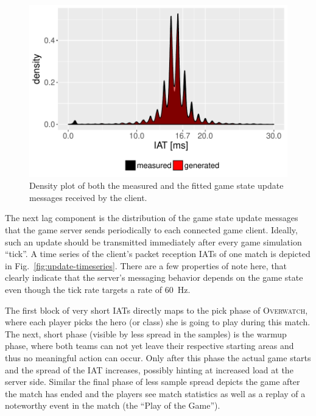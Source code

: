 	\begin{figure}[t]
		\centering
		\includegraphics[width=1.0\columnwidth]{images/update-density.pdf}
		\caption{Density plot of both the measured and the fitted game state update messages received by the client.}
	\label{fig:update-density}
	\end{figure}

	The next lag component is the distribution of the game state update messages that the game server sends periodically to each connected game client. Ideally, such an update should be transmitted immediately after every game simulation ``tick''. A time series of the client's packet reception \glspl{IAT} of one match is depicted in Fig.~\ref{fig:update-timeseries}. There are a few properties of note here, that clearly indicate that the server's messaging behavior depends on the game state even though the tick rate targets a rate of \SI{60}{\hertz}. 

	The first block of very short \glspl{IAT} directly maps to the pick phase of \textsc{Overwatch}, where each player picks the hero (or class) she is going to play during this match. The next, short phase (visible by less spread in the samples) is the warmup phase, where both teams can not yet leave their respective starting areas and thus no meaningful action can occur. Only after this phase the actual game starts and the spread of the \gls{IAT} increases, possibly hinting at increased load at the server side. Similar the final phase of less sample spread depicts the game after the match has ended and the players see match statistics as well as a replay of a noteworthy event in the match (the ``Play of the Game'').

